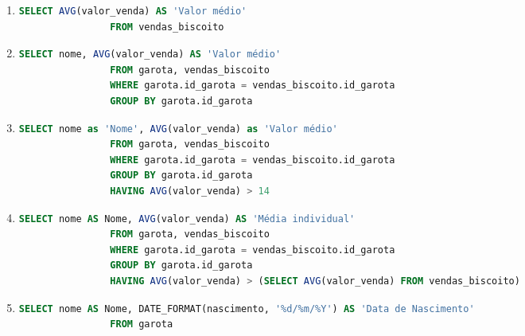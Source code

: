 \documentclass{article}
\begin{document}
\begin{enumerate}[label=\alph*.]
\begin{enumerate}[label=\roman*., labelsep=0.5em, leftmargin=*]
        \item 
        \begin{adjustwidth}{1em}{0pt}
            \begin{lstlisting}[language=SQL]
                SELECT AVG(valor_venda) AS 'Valor médio'
                FROM vendas_biscoito
            \end{lstlisting}
        \end{adjustwidth}

        \item 
        \begin{adjustwidth}{1em}{0pt}
            \begin{lstlisting}[language=SQL]
                SELECT nome, AVG(valor_venda) AS 'Valor médio'
                FROM garota, vendas_biscoito
                WHERE garota.id_garota = vendas_biscoito.id_garota
                GROUP BY garota.id_garota
            \end{lstlisting}
        \end{adjustwidth}

        \item 
        \begin{adjustwidth}{1em}{0pt}
            \begin{lstlisting}[language=SQL]
                SELECT nome as 'Nome', AVG(valor_venda) as 'Valor médio'
                FROM garota, vendas_biscoito
                WHERE garota.id_garota = vendas_biscoito.id_garota
                GROUP BY garota.id_garota
                HAVING AVG(valor_venda) > 14
            \end{lstlisting}
        \end{adjustwidth}

        \item 
        \begin{adjustwidth}{1em}{0pt}
            \begin{lstlisting}[language=SQL]
                SELECT nome AS Nome, AVG(valor_venda) AS 'Média individual'
                FROM garota, vendas_biscoito
                WHERE garota.id_garota = vendas_biscoito.id_garota
                GROUP BY garota.id_garota
                HAVING AVG(valor_venda) > (SELECT AVG(valor_venda) FROM vendas_biscoito)                
            \end{lstlisting}
        \end{adjustwidth}

        \item 
        \begin{adjustwidth}{1em}{0pt}
            \begin{lstlisting}[language=SQL]
                SELECT nome AS Nome, DATE_FORMAT(nascimento, '%d/%m/%Y') AS 'Data de Nascimento'
                FROM garota
            \end{lstlisting}
        \end{adjustwidth}


\end{enumerate}
\end{enumerate}
\end{document}
